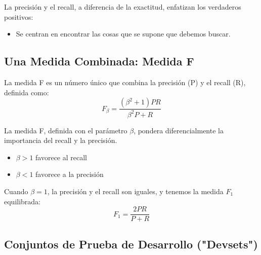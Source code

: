 La precisión y el recall, a diferencia de la exactitud, enfatizan los verdaderos positivos:
\begin{itemize}
  \item Se centran en encontrar las cosas que se supone que debemos buscar.
\end{itemize}

\subsection{Una Medida Combinada: Medida F}
La medida F es un número único que combina la precisión (P) y el recall (R), definida como:
\[
F_\beta = \frac{(\beta^2+1)PR}{\beta^2P + R}
\]

La medida F, definida con el parámetro $\beta$, pondera diferencialmente la importancia del recall y la precisión.
\begin{itemize}
  \item $\beta > 1$ favorece al recall
  \item $\beta < 1$ favorece a la precisión
\end{itemize}

Cuando $\beta = 1$, la precisión y el recall son iguales, y tenemos la medida $F_1$ equilibrada:
\[
F_1 = \frac{2PR}{P + R}
\]

\subsection{Conjuntos de Prueba de Desarrollo ("Devsets")}

